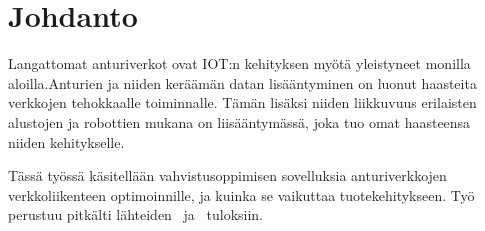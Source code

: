 \section{Johdanto}
Langattomat anturiverkot ovat IOT:n kehityksen myötä yleistyneet monilla
aloilla.Anturien ja niiden keräämän datan lisääntyminen on luonut haasteita
verkkojen tehokkaalle toiminnalle. Tämän lisäksi niiden liikkuvuus erilaisten
alustojen ja robottien mukana on liisääntymässä, joka tuo omat haasteensa
niiden kehitykselle.

Tässä työssä käsitellään vahvistusoppimisen sovelluksia anturiverkkojen
verkkoliikenteen optimoinnille, ja kuinka se vaikuttaa tuotekehitykseen. Työ
perustuu pitkälti lähteiden~\cite{Arya2015} ja~\cite{Yu2006} tuloksiin.
